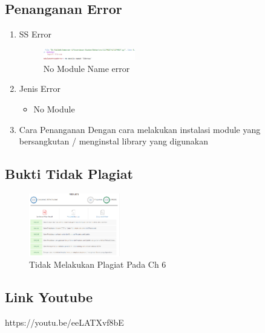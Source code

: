 \subsection{Penanganan Error}
\begin{enumerate}
	\item SS Error
	\begin{figure}[H]
		\includegraphics[width=4cm]{figures/1174069/6/error/6_no_module.png}
		\centering
		\caption{No Module Name error}
	\end{figure}
	\item Jenis Error
	\begin{itemize}
		\item No Module
	\end{itemize}
	\item Cara Penanganan
	\hfill\break
	Dengan cara melakukan instalasi module yang bersangkutan / menginstal library yang digunakan
\end{enumerate}
\subsection{Bukti Tidak Plagiat}
\begin{figure}[H]
    \includegraphics[width=4cm]{figures/1174069/6/bukti/bukti.PNG}
    \centering
    \caption{Tidak Melakukan Plagiat Pada Ch 6}
\end{figure}
\subsection{Link Youtube}
https://youtu.be/eeLATXvf8bE